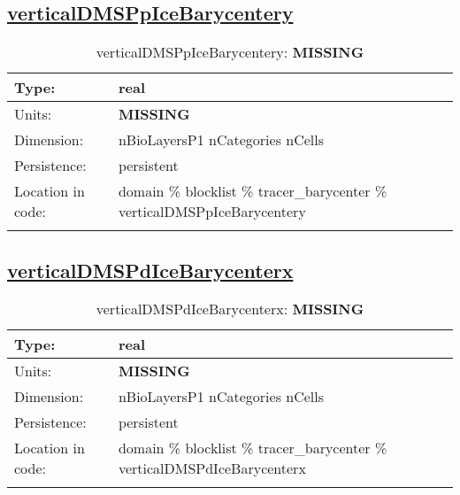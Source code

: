 \subsection[verticalDMSPpIceBarycentery]{\hyperref[sec:var_tab_tracer_barycenter]{verticalDMSPpIceBarycentery}}
\label{subsec:var_sec_tracer_barycenter_verticalDMSPpIceBarycentery}
\begin{center}
\begin{longtable}{| p{2.0in} | p{4.0in} |}
        \hline 
        Type: & real \\
        \hline 
        Units: & {\bf \color{red} MISSING} \\
        \hline 
        Dimension: & nBioLayersP1 nCategories nCells \\
        \hline 
        Persistence: & persistent \\
        \hline 
         Location in code: & domain \% blocklist \% tracer\_barycenter \% verticalDMSPpIceBarycentery \\
         \hline 
    \caption{verticalDMSPpIceBarycentery: {\bf \color{red} MISSING}}
\end{longtable}
\end{center}
\subsection[verticalDMSPdIceBarycenterx]{\hyperref[sec:var_tab_tracer_barycenter]{verticalDMSPdIceBarycenterx}}
\label{subsec:var_sec_tracer_barycenter_verticalDMSPdIceBarycenterx}
\begin{center}
\begin{longtable}{| p{2.0in} | p{4.0in} |}
        \hline 
        Type: & real \\
        \hline 
        Units: & {\bf \color{red} MISSING} \\
        \hline 
        Dimension: & nBioLayersP1 nCategories nCells \\
        \hline 
        Persistence: & persistent \\
        \hline 
         Location in code: & domain \% blocklist \% tracer\_barycenter \% verticalDMSPdIceBarycenterx \\
         \hline 
    \caption{verticalDMSPdIceBarycenterx: {\bf \color{red} MISSING}}
\end{longtable}
\end{center}
